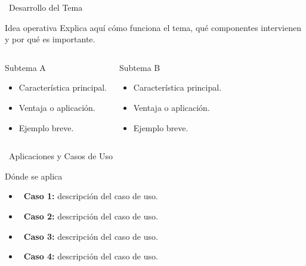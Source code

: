 \documentclass[10pt, aspectratio=169]{beamer}
\begin{document}
\expositor{\Grupo}
\begin{frame}{\faMicrochip \ Desarrollo del Tema}
  \begin{block}{Idea operativa}
    Explica aquí cómo funciona el tema, qué componentes intervienen y por qué es importante.
  \end{block}

  \begin{columns}[T]
    \begin{exampleblock}{Subtema A}
      \begin{itemize}
        \item Característica principal.
        \item Ventaja o aplicación.
        \item Ejemplo breve.
      \end{itemize}
    \end{exampleblock}
    \begin{exampleblock}{Subtema B}
      \begin{itemize}
        \item Característica principal.
        \item Ventaja o aplicación.
        \item Ejemplo breve.
      \end{itemize}
    \end{exampleblock}
  \end{columns}
\end{frame}

\expositor{\Grupo}
\begin{frame}{\faBriefcase \ Aplicaciones y Casos de Uso}
  \begin{block}{Dónde se aplica}
    \begin{itemize}
      \item \textbf{\faBriefcase \ Caso 1:} descripción del caso de uso.
      \item \textbf{\faCogs \ Caso 2:} descripción del caso de uso.
      \item \textbf{\faUsers \ Caso 3:} descripción del caso de uso.
      \item \textbf{\faChartLine \ Caso 4:} descripción del caso de uso.
    \end{itemize}
  \end{block}

  \begin{center}
    \textcolor{unabblue}{\Large \faLightbulb \quad \faProjectDiagram \quad \faClipboardCheck \quad \faChartBar}
  \end{center}
\end{frame}
\end{document}
